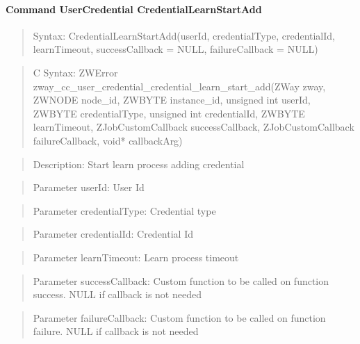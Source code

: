 \paragraph{Command UserCredential CredentialLearnStartAdd}
\begin{quote}Syntax: CredentialLearnStartAdd(userId, credentialType, credentialId, learnTimeout, successCallback = NULL, failureCallback = NULL)\end{quote}
\begin{quote}C Syntax: ZWError zway\_cc\_user\_credential\_credential\_learn\_start\_add(ZWay zway, ZWNODE node\_id, ZWBYTE instance\_id, unsigned int userId, ZWBYTE credentialType, unsigned int credentialId, ZWBYTE learnTimeout, ZJobCustomCallback successCallback, ZJobCustomCallback failureCallback, void* callbackArg)\end{quote}
\begin{quote}Description: Start learn process adding credential\end{quote}
\begin{quote}Parameter userId: User Id\end{quote}
\begin{quote}Parameter credentialType: Credential type\end{quote}
\begin{quote}Parameter credentialId: Credential Id\end{quote}
\begin{quote}Parameter learnTimeout: Learn process timeout\end{quote}
\begin{quote}Parameter successCallback: Custom function to be called on function success. NULL if callback is not needed\end{quote}
\begin{quote}Parameter failureCallback: Custom function to be called on function failure. NULL if callback is not needed\end{quote}


